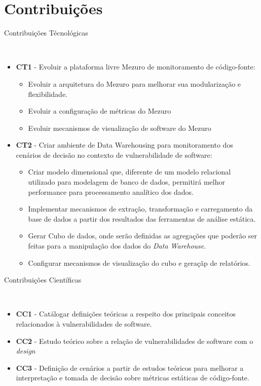 \section{Contribuições}
%
\begin{description}
	\item [Contribuições Técnológicas]\
\end{description}
		\begin{itemize}
			\item \textbf{CT1} - Evoluir a plataforma livre Mezuro de monitoramento de código-fonte:
				\begin{itemize}
					\item Evoluir a arquitetura do Mezuro para melhorar sua modularização e flexibilidade.
					\item Evoluir a configuração de métricas do Mezuro
					\item Evoluir mecanismos de visualização de software do Mezuro
				\end{itemize}
			\item \textbf{CT2} - Criar ambiente de Data Warehousing para monitoramento dos cenários de decisão no contexto de vulnerabilidade de software:
	        	\begin{itemize}
	        		\item Criar modelo dimensional que, diferente de um modelo relacional utilizado para modelagem de banco de dados, permitirá melhor performance para processamento analítico dos dados.
	        		\item Implementar mecanismos de extração, transformação e carregamento da base de dados a partir dos resultados das ferramentas de análise estática.
	        		\item Gerar Cubo de dados, onde serão definidas as agregações que poderão ser feitas para a manipulação dos dados do \emph{Data Warehouse}.
					\item Configurar mecanismos de visualização do cubo e geraçãp de relatórios.
	        	\end{itemize}
		\end{itemize}
\begin{description}
	\item [Contribuições Científicas]\
\end{description}	
	 	\begin{itemize}
			\item \textbf{CC1} - Catálogar definições teóricas a respeito dos principais conceitos relacionados à vulnerabilidades de software.
			\item \textbf{CC2} - Estudo teórico sobre a relação de vulnerabilidades de software com o \emph{design}
			\item \textbf{CC3} - Definição de cenários a partir de estudos teóricos para melhorar a interpretação e tomada de decisão sobre métricas estáticas de código-fonte.
	 	\end{itemize}

